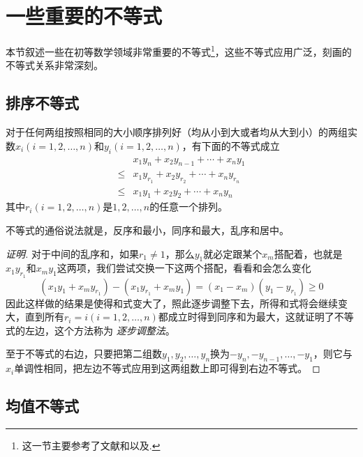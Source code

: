 
\section{一些重要的不等式}
\label{sec:some-important-inequation}

本节叙述一些在初等数学领域非常重要的不等式\footnote{这一节主要参考了文献\cite{contest-math-course}和\cite{caculus-course}以及\cite{olympic-math}.}，这些不等式应用广泛，刻画的不等式关系非常深刻。

\subsection{排序不等式}

\begin{theorem}[排序不等式]
  对于任何两组按照相同的大小顺序排列好（均从小到大或者均从大到小）的两组实数$x_i(i=1,2,\ldots,n)$和$y_i(i=1,2,\ldots,n)$，有下面的不等式成立
  \begin{eqnarray}
    \label{eq:rearrangement inequality}
    & x_1y_n+x_2y_{n-1}+\cdots+x_ny_1 \nonumber \\
    \leqslant & x_1y_{r_1}+x_2y_{r_2}+\cdots+x_ny_{r_n} \nonumber \\
    \leqslant & x_1y_1+x_2y_2+\cdots+x_ny_n
  \end{eqnarray}
  其中$r_i(i=1,2,\ldots,n)$是$1,2,\ldots,n$的任意一个排列。
\end{theorem}
不等式的通俗说法就是，反序和最小，同序和最大，乱序和居中。

\begin{proof}[证明]
  对于中间的乱序和，如果$r_1 \neq 1$，那么$y_1$就必定跟某个$x_m$搭配着，也就是$x_1y_{r_1}$和$x_my_1$这两项，我们尝试交换一下这两个搭配，看看和会怎么变化
  \begin{equation*}
    (x_1y_1+x_my_{r_1})-(x_1y_{r_1}+x_my_1) = (x_1-x_m)(y_1-y_{r_1}) \geqslant 0
  \end{equation*}
  因此这样做的结果是使得和式变大了，照此逐步调整下去，所得和式将会继续变大，直到所有$r_i=i(i=1,2,\ldots,n)$都成立时得到同序和为最大，这就证明了不等式的左边，这个方法称为 \emph{逐步调整法}。

  至于不等式的右边，只要把第二组数$y_1,y_2,\ldots,y_n$换为$-y_n,-y_{n-1},\ldots,-y_1$，则它与$x_i$单调性相同，把左边不等式应用到这两组数上即可得到右边不等式。
\end{proof}


\subsection{均值不等式}

